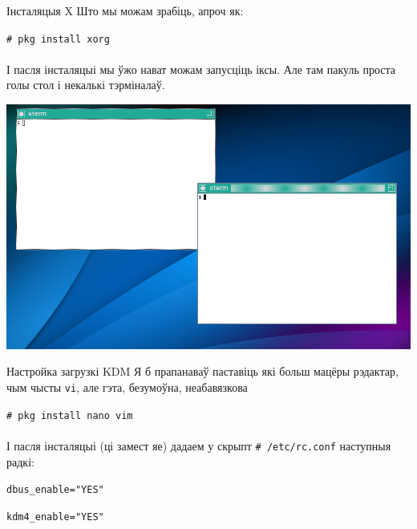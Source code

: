 \documentclass[ignorenonframetext,hyperref={pdftex,unicode}]{beamer}
\newcommand{\shellcmd}[1]{
\indent\indent\indent\texttt{\footnotesize\# #1}
}
\newcommand{\cfgline}[1]{
\indent\indent\indent\texttt{\footnotesize #1}
}
\begin{document}
\begin{frame}{Інсталяцыя X} %
	Што мы можам зрабіць, апроч як:

	\shellcmd{pkg install xorg} \pause
	\\~\\	
	І пасля інсталяцыі мы ўжо нават можам запусціць іксы. Але там пакуль проста голы стол і некалькі тэрміналаў.
	\begin{center}
 		\includegraphics[height=0.6\textheight,keepaspectratio]{TWM} %
	\end{center}
\end{frame} %

\begin{frame}{Настройка загрузкі KDM} %
	Я б прапанаваў паставіць які больш мацёры рэдактар, чым чысты \texttt{vi}, але гэта, безумоўна, неабавязкова

	\shellcmd{pkg install nano vim} \pause
	\\~\\	
	І пасля інсталяцыі (ці замест яе) дадаем у скрыпт \shellcmd{/etc/rc.conf} наступныя радкі:

	\cfgline{dbus\_enable="YES"}
	
	\cfgline{kdm4\_enable="YES"}
\end{frame} %
\end{document}
